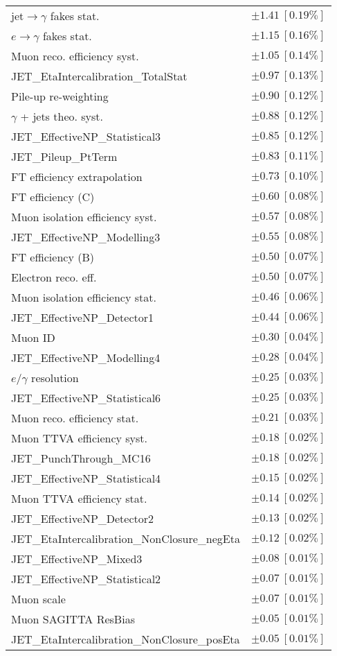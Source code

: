 \begin{tabular}{lr}
jet$\to\gamma$ fakes stat. & $\pm 1.41\ [0.19\%]$ \\
$e\to\gamma$ fakes stat. & $\pm 1.15\ [0.16\%]$ \\
Muon reco. efficiency syst. & $\pm 1.05\ [0.14\%]$ \\
JET\_EtaIntercalibration\_TotalStat & $\pm 0.97\ [0.13\%]$ \\
Pile-up re-weighting & $\pm 0.90\ [0.12\%]$ \\
$\gamma$ + jets theo. syst. & $\pm 0.88\ [0.12\%]$ \\
JET\_EffectiveNP\_Statistical3 & $\pm 0.85\ [0.12\%]$ \\
JET\_Pileup\_PtTerm & $\pm 0.83\ [0.11\%]$ \\
FT efficiency extrapolation & $\pm 0.73\ [0.10\%]$ \\
FT efficiency (C) & $\pm 0.60\ [0.08\%]$ \\
Muon isolation efficiency syst. & $\pm 0.57\ [0.08\%]$ \\
JET\_EffectiveNP\_Modelling3 & $\pm 0.55\ [0.08\%]$ \\
FT efficiency (B) & $\pm 0.50\ [0.07\%]$ \\
Electron reco. eff. & $\pm 0.50\ [0.07\%]$ \\
Muon isolation efficiency stat. & $\pm 0.46\ [0.06\%]$ \\
JET\_EffectiveNP\_Detector1 & $\pm 0.44\ [0.06\%]$ \\
Muon ID & $\pm 0.30\ [0.04\%]$ \\
JET\_EffectiveNP\_Modelling4 & $\pm 0.28\ [0.04\%]$ \\
$e/\gamma$ resolution & $\pm 0.25\ [0.03\%]$ \\
JET\_EffectiveNP\_Statistical6 & $\pm 0.25\ [0.03\%]$ \\
Muon reco. efficiency stat. & $\pm 0.21\ [0.03\%]$ \\
Muon TTVA efficiency syst. & $\pm 0.18\ [0.02\%]$ \\
JET\_PunchThrough\_MC16 & $\pm 0.18\ [0.02\%]$ \\
JET\_EffectiveNP\_Statistical4 & $\pm 0.15\ [0.02\%]$ \\
Muon TTVA efficiency stat. & $\pm 0.14\ [0.02\%]$ \\
JET\_EffectiveNP\_Detector2 & $\pm 0.13\ [0.02\%]$ \\
JET\_EtaIntercalibration\_NonClosure\_negEta & $\pm 0.12\ [0.02\%]$ \\
JET\_EffectiveNP\_Mixed3 & $\pm 0.08\ [0.01\%]$ \\
JET\_EffectiveNP\_Statistical2 & $\pm 0.07\ [0.01\%]$ \\
Muon scale & $\pm 0.07\ [0.01\%]$ \\
Muon SAGITTA ResBias & $\pm 0.05\ [0.01\%]$ \\
JET\_EtaIntercalibration\_NonClosure\_posEta & $\pm 0.05\ [0.01\%]$ \\
\hline
\end{tabular}
